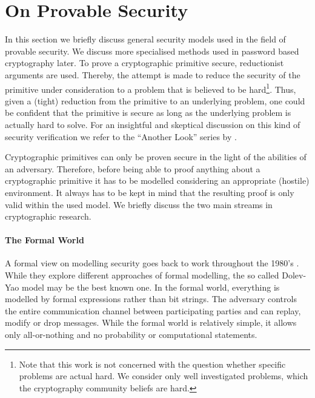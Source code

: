 
\section{On Provable Security}
In this section we briefly discuss general security models used in the field of provable security.
We discuss more specialised methods used in password based cryptography later.
To prove a cryptographic primitive secure, reductionist arguments are used.
Thereby, the attempt is made to reduce the security of the primitive under consideration to a problem that is believed to be hard\footnote{Note that this work is not concerned with the question whether specific problems are actual hard. We consider only well investigated problems, which the cryptography community beliefs are hard.}.
Thus, given a (tight) reduction from the primitive to an underlying problem, one could be confident that the primitive is secure as long as the underlying problem is actually hard to solve.
For an insightful and skeptical discussion on this kind of security verification we refer to the ``Another Look'' series by \citeauthor{AnotherLook} \cite{AnotherLook}.

Cryptographic primitives can only be proven secure in the light of the abilities of an adversary.
Therefore, before being able to proof anything about a cryptographic primitive it has to be modelled considering an appropriate (hostile) environment.
It always has to be kept in mind that the resulting proof is only valid within the used model.
We briefly discuss the two main streams in cryptographic research.

\paragraph{The Formal World}
A formal view on modelling security goes back to work throughout the 1980's \cite{DeMillo82,Dolev83,Millen87,Meadows91,Kemmerer1988,Burrows90}.
While they explore different approaches of formal modelling, the so called Dolev-Yao model \cite{Dolev83} may be the best known one.
In the formal world, everything is modelled by formal expressions rather than bit strings.
The adversary controls the entire communication channel between participating parties and can replay, modify or drop messages.
While the formal world is relatively simple, it allows only all-or-nothing  and no probability or computational statements.

